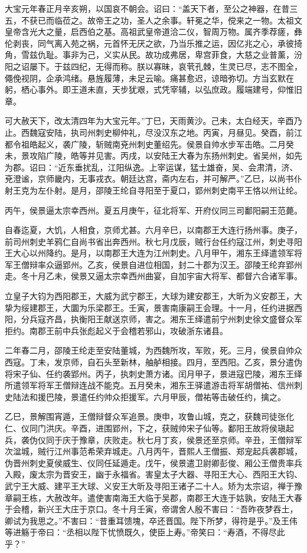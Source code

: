 \documentclass[12pt,UTF8]{ctexbook}
\begin{document}
大宝元年春正月辛亥朔，以国哀不朝会。诏曰：“盖天下者，至公之神器，在昔三五，不获已而临莅之。故帝王之功，圣人之余事。轩冕之华，傥来之一物。太祖文皇帝含光大之量，启西伯之基。高祖武皇帝道洽二仪，智周万物。属齐季荐瘥，彝伦剥丧，同气离入苑之祸，元首怀无厌之欲，乃当乐推之运，因亿兆之心，承彼掎角，雪兹仇耻。事非为己，义实从民。故功成弗居，卑宫菲食，大慈之业普薰，汾阳之诏屡下。于兹四纪，无得而称。朕以寡昧，哀茕孔棘，生灵已尽，志不图全，僶俛视阴，企承鸿绪。悬旌履薄，未足云喻。痛甚愈迟，谅暗弥切。方当玄默在躬，栖心事外。即王道未直，天步犹艰，式凭宰辅，以弘庶政。履端建号，仰惟旧章。

可大赦天下，改太清四年为大宝元年。”丁巳，天雨黄沙。己未，太白经天，辛酉乃止。西魏寇安陆，执司州刺史柳仲礼，尽没汉东之地。丙寅，月昼见。癸酉，前江都令祖皓起义，袭广陵，斩贼南兗州刺史董绍先。侯景自帅水步军击皓。二月癸未，景攻陷广陵，皓等并见害。丙戌，以安陆王大春为东扬州刺史。省吴州，如先为郡。诏曰：“近东垂扰乱，江阳纵逸。上宰运谋，猛士雄奋，吴、会肃清，济、兗澄谧，京师畿内，无事戎衣。朝廷达宫，斋内左右，并可解严。”乙巳，以尚书仆射王克为左仆射。是月，邵陵王纶自寻阳至于夏口，郢州刺史南平王恪以州让纶。

丙午，侯景逼太宗幸西州。夏五月庚午，征北将军、开府仪同三司鄱阳嗣王范薨。

自春迄夏，大饥，人相食，京师尤甚。六月辛巳，以南郡王大连行扬州事。庚子，前司州刺史羊鸦仁自尚书省出奔西州。秋七月戊辰，贼行台任约寇江州，刺史寻阳王大心以州降约。是月，以南郡王大连为江州刺史。八月甲午，湘东王绎遣领军将军王僧辩率众逼郢州。乙亥，侯景自进位相国，封二十郡为汉王。邵陵王纶弃郢州走。冬十月乙未，侯景又逼太宗幸西州曲宴，自加宇宙大将军、都督六合诸军事。

立皇子大钧为西阳郡王，大威为武宁郡王，大球为建安郡王，大昕为义安郡王，大挚为绥建郡王，大圜为乐梁郡王。壬寅，景害南康嗣王会理。十一月，任约进据西阳，分兵寇齐昌，执衡阳王献送京师，害之。湘东王绎遣前宁州刺史徐文盛督众军拒约。南郡王前中兵张彪起义于会稽若邪山，攻破浙东诸县。

二年春二月，邵陵王纶走至安陆董城，为西魏所攻，军败，死。三月，侯景自帅众西寇。丁未，发京师，自石头至新林，舳舻相接。四月，至西阳。乙亥，景分遣伪将宋子仙、任约袭郢州。丙子，执刺史萧方诸。闰月甲子，景进寇巴陵，湘东王绎所遣领军将军王僧辩连战不能克。五月癸未，湘东王驿遣游击将军胡僧祐、信州刺史陆法和援巴陵，景遣任约帅众拒援军。六月甲辰，僧祐等击破任约，擒之。

乙巳，景解围宵遁，王僧辩督众军追景。庚申，攻鲁山城，克之，获魏司徒张化仁、仪同门洪庆。辛酉，进围郢州，下之，获贼帅宋子仙等。鄱阳王故将侯瑱起兵，袭伪仪同于庆于豫章，庆败走。秋七月丁亥，侯景还至京师。辛丑，王僧辩军次湓城，贼行江州事范希荣弃城走。八月丙午，晋熙人王僧振、郑宠起兵袭郡城，伪晋州刺史夏侯威生、仪同任延遁走。戊午，侯景遣卫尉卿彭俊、厢公王僧贵率兵入殿，废太宗为晋安王，幽于永福省。害皇太子大器、寻阳王大心、西阳王大钧、武宁王大威、建平王大球、义安王大昕及寻阳王诸子二十人。矫为太宗诏，禅于豫章嗣王栋，大赦改年。遣使害南海王大临于吴郡，南郡王大连于姑孰，安陆王大春于会稽，新兴王大庄于京口。冬十月壬寅，帝谓舍人殷不害曰：“吾昨夜梦吞土，卿试为我思之。”不害曰：“昔重耳馈塊，卒还晋国。陛下所梦，得符是乎。”及王伟等进觞于帝曰：“丞相以陛下忧愤既久，使臣上寿。”帝笑曰：“寿酒，不得尽此乎？”
\end{document}
